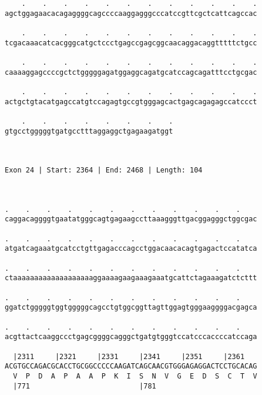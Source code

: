\documentclass{article}
\begin{document}
\begin{Verbatim}
    .    .    .    .    .    .    .    .    .    .    .    .
agctggagaacacagaggggcagccccaaggagggcccatccgttcgctcattcagccac
                                                            
    .    .    .    .    .    .    .    .    .    .    .    .
tcgacaaacatcacgggcatgctccctgagccgagcggcaacaggacaggtttttctgcc
                                                            
    .    .    .    .    .    .    .    .    .    .    .    .
caaaaggagccccgctctgggggagatggaggcagatgcatccagcagatttcctgcgac
                                                            
    .    .    .    .    .    .    .    .    .    .    .    .
actgctgtacatgagccatgtccagagtgccgtgggagcactgagcagagagccatccct
                                                            
    .    .    .    .    .    .    .    .
gtgcctgggggtgatgcctttaggaggctgagaagatggt
                                        
                                        
 
Exon 24 | Start: 2364 | End: 2468 | Length: 104



.    .    .    .    .    .    .    .    .    .    .    .    
caggacaggggtgaatatgggcagtgagaagccttaaagggttgacggagggctggcgac
                                                            
.    .    .    .    .    .    .    .    .    .    .    .    
atgatcagaaatgcatcctgttgagacccagcctggacaacacagtgagactccatatca
                                                            
.    .    .    .    .    .    .    .    .    .    .    .    
ctaaaaaaaaaaaaaaaaaaaggaaaagaagaaagaaatgcattctagaaagatctcttt
                                                            
.    .    .    .    .    .    .    .    .    .    .    .    
ggatctgggggtggtgggggcagcctgtggcggttagttggagtgggaaggggacgagca
                                                            
.    .    .    .    .    .    .    .    .    .    .    .    
acgttactcaaggccctgagcggggcagggctgatgtgggtccatcccaccccatccaga
                                                            
  |2311     |2321     |2331     |2341     |2351     |2361   
ACGTGCCAGACGCACCTGCGGCCCCCAAGATCAGCAACGTGGGAGAGGACTCCTGCACAG
  V  P  D  A  P  A  A  P  K  I  S  N  V  G  E  D  S  C  T  V
  |771                          |781                        
  

\end{Verbatim}
\end{document}
